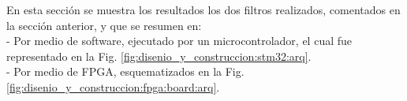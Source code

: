 \documentclass[informe.tex]{subfiles}
\begin{document}
En esta sección se muestra los resultados los dos filtros realizados, comentados en la sección anterior, y que se resumen en:\\

- Por medio de software, ejecutado por un microcontrolador, el cual fue representado en la Fig. \ref{fig:disenio_y_construccion:stm32:arq}.\\

- Por medio de FPGA, esquematizados en la Fig.  \ref{fig:disenio_y_construccion:fpga:board:arq}.\\
\end{document}
